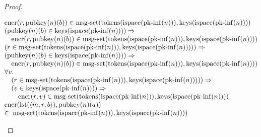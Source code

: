 \documentclass[11pt]{article}
\theoremstyle{plain}
\begin{document}
\begin{proof}
\begin{itemize}[leftmargin=2.8em, itemsep=4pt, parsep=1pt]
\begin{itemize}[leftmargin=2.8em, itemsep=4pt, parsep=1pt]
\begin{equation*}
\begin{array}{@{}l@{}}
\operatorname{encr}(r, \operatorname{pubkey}(n)(b)) \in \operatorname{msg\text{-}set}(\operatorname{tokens}(\operatorname{ispace}(\operatorname{pk\text{-}inf}(n))), \operatorname{keys}(\operatorname{ispace}(\operatorname{pk\text{-}inf}(n)))) \\
\begin{array}{@{}l@{}} (\operatorname{pubkey}(n)(b) \in \operatorname{keys}(\operatorname{ispace}(\operatorname{pk\text{-}inf}(n)))) \Rightarrow  \\ \quad \operatorname{encr}(r, \operatorname{pubkey}(n)(b)) \in \operatorname{msg\text{-}set}(\operatorname{tokens}(\operatorname{ispace}(\operatorname{pk\text{-}inf}(n))), \operatorname{keys}(\operatorname{ispace}(\operatorname{pk\text{-}inf}(n)))) \end{array} \\
\begin{array}{@{}l@{}} (r \in \operatorname{msg\text{-}set}(\operatorname{tokens}(\operatorname{ispace}(\operatorname{pk\text{-}inf}(n))), \operatorname{keys}(\operatorname{ispace}(\operatorname{pk\text{-}inf}(n))))) \Rightarrow  \\ (\operatorname{pubkey}(n)(b) \in \operatorname{keys}(\operatorname{ispace}(\operatorname{pk\text{-}inf}(n)))) \Rightarrow  \\ \quad \operatorname{encr}(r, \operatorname{pubkey}(n)(b)) \in \operatorname{msg\text{-}set}(\operatorname{tokens}(\operatorname{ispace}(\operatorname{pk\text{-}inf}(n))), \operatorname{keys}(\operatorname{ispace}(\operatorname{pk\text{-}inf}(n)))) \end{array} \\
\begin{array}{@{}l@{}} \forall v. \\ \quad (r \in \operatorname{msg\text{-}set}(\operatorname{tokens}(\operatorname{ispace}(\operatorname{pk\text{-}inf}(n))), \operatorname{keys}(\operatorname{ispace}(\operatorname{pk\text{-}inf}(n))))) \Rightarrow  \\ \quad (v \in \operatorname{keys}(\operatorname{ispace}(\operatorname{pk\text{-}inf}(n)))) \Rightarrow  \\ \quad \quad \operatorname{encr}(r, v) \in \operatorname{msg\text{-}set}(\operatorname{tokens}(\operatorname{ispace}(\operatorname{pk\text{-}inf}(n))), \operatorname{keys}(\operatorname{ispace}(\operatorname{pk\text{-}inf}(n)))) \end{array} \\
\begin{array}{@{}l@{}} \operatorname{encr}(\operatorname{lst}(\langle m, r, b \rangle), \operatorname{pubkey}(n)(a)) \\ \in\; \operatorname{msg\text{-}set}(\operatorname{tokens}(\operatorname{ispace}(\operatorname{pk\text{-}inf}(n))), \operatorname{keys}(\operatorname{ispace}(\operatorname{pk\text{-}inf}(n)))) \end{array} \\

\end{array}
\end{equation*}
\end{itemize}
\end{itemize}
\end{proof}
\end{document}
